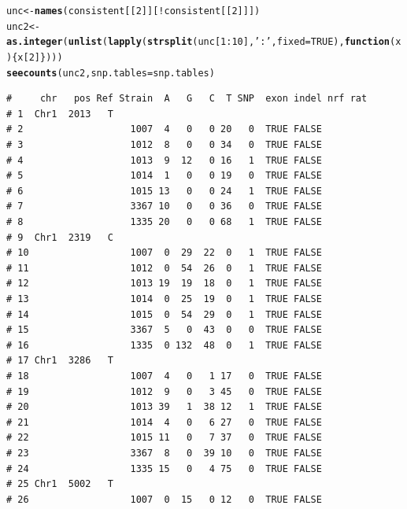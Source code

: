 \documentclass{article}\usepackage[]{graphicx}\usepackage[]{color}
\makeatletter
\newcommand{\hlnum}[1]{\textcolor[rgb]{0.686,0.059,0.569}{#1}}%
\newcommand{\hlstr}[1]{\textcolor[rgb]{0.192,0.494,0.8}{#1}}%
\newcommand{\hlopt}[1]{\textcolor[rgb]{0,0,0}{#1}}%
\newcommand{\hlstd}[1]{\textcolor[rgb]{0.345,0.345,0.345}{#1}}%
\newcommand{\hlkwa}[1]{\textcolor[rgb]{0.161,0.373,0.58}{\textbf{#1}}}%
\newcommand{\hlkwb}[1]{\textcolor[rgb]{0.69,0.353,0.396}{#1}}%
\newcommand{\hlkwc}[1]{\textcolor[rgb]{0.333,0.667,0.333}{#1}}%
\newcommand{\hlkwd}[1]{\textcolor[rgb]{0.737,0.353,0.396}{\textbf{#1}}}%
\newenvironment{kframe}{%
 \def\at@end@of@kframe{}%
 \ifinner\ifhmode%
  \def\at@end@of@kframe{\end{minipage}}%
  \begin{minipage}{\columnwidth}%
 \fi\fi%
 \def\FrameCommand##1{\hskip\@totalleftmargin \hskip-\fboxsep
 \colorbox{shadecolor}{##1}\hskip-\fboxsep
     \hskip-\linewidth \hskip-\@totalleftmargin \hskip\columnwidth}%
 \MakeFramed {\advance\hsize-\width
   \@totalleftmargin\z@ \linewidth\hsize
   \@setminipage}}%
 {\par\unskip\endMakeFramed%
 \at@end@of@kframe}
\newenvironment{knitrout}{}{} %
\makeatother
\begin{document}
\begin{knitrout}\footnotesize
{}\color{fgcolor}\begin{kframe}
\begin{alltt}
\hlstd{unc} \hlkwb{<-} \hlkwd{names}\hlstd{(consistent[[}\hlnum{2}\hlstd{]][}\hlopt{!}\hlstd{consistent[[}\hlnum{2}\hlstd{]]])}
\hlstd{unc2} \hlkwb{<-} \hlkwd{as.integer}\hlstd{(}\hlkwd{unlist}\hlstd{(}\hlkwd{lapply}\hlstd{(}\hlkwd{strsplit}\hlstd{(unc[}\hlnum{1}\hlopt{:}\hlnum{10}\hlstd{],}\hlstr{':'}\hlstd{,}\hlkwc{fixed}\hlstd{=}\hlnum{TRUE}\hlstd{),}\hlkwa{function}\hlstd{(}\hlkwc{x}\hlstd{)\{x[}\hlnum{2}\hlstd{]\})))}
\hlkwd{seecounts}\hlstd{(unc2,}\hlkwc{snp.tables}\hlstd{=snp.tables)}
\end{alltt}
\begin{verbatim}
#     chr   pos Ref Strain  A   G   C  T SNP  exon indel nrf rat
# 1  Chr1  2013   T                                             
# 2                   1007  4   0   0 20   0  TRUE FALSE        
# 3                   1012  8   0   0 34   0  TRUE FALSE        
# 4                   1013  9  12   0 16   1  TRUE FALSE        
# 5                   1014  1   0   0 19   0  TRUE FALSE        
# 6                   1015 13   0   0 24   1  TRUE FALSE        
# 7                   3367 10   0   0 36   0  TRUE FALSE        
# 8                   1335 20   0   0 68   1  TRUE FALSE        
# 9  Chr1  2319   C                                             
# 10                  1007  0  29  22  0   1  TRUE FALSE        
# 11                  1012  0  54  26  0   1  TRUE FALSE        
# 12                  1013 19  19  18  0   1  TRUE FALSE        
# 13                  1014  0  25  19  0   1  TRUE FALSE        
# 14                  1015  0  54  29  0   1  TRUE FALSE        
# 15                  3367  5   0  43  0   0  TRUE FALSE        
# 16                  1335  0 132  48  0   1  TRUE FALSE        
# 17 Chr1  3286   T                                             
# 18                  1007  4   0   1 17   0  TRUE FALSE        
# 19                  1012  9   0   3 45   0  TRUE FALSE        
# 20                  1013 39   1  38 12   1  TRUE FALSE        
# 21                  1014  4   0   6 27   0  TRUE FALSE        
# 22                  1015 11   0   7 37   0  TRUE FALSE        
# 23                  3367  8   0  39 10   0  TRUE FALSE        
# 24                  1335 15   0   4 75   0  TRUE FALSE        
# 25 Chr1  5002   T                                             
# 26                  1007  0  15   0 12   0  TRUE FALSE        

\end{verbatim}
\end{kframe}
\end{knitrout}
\end{document}
